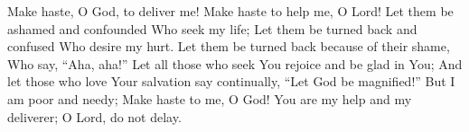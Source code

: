 
Make haste, O God, to deliver me! Make haste to help me, O Lord! Let them be ashamed and confounded Who seek my life; Let them be turned back and confused Who desire my hurt. Let them be turned back because of their shame, Who say, ``Aha, aha!'' Let all those who seek You rejoice and be glad in You; And let those who love Your salvation say continually, ``Let God be magnified!'' But I am poor and needy; Make haste to me, O God! You are my help and my deliverer; O Lord, do not delay.
